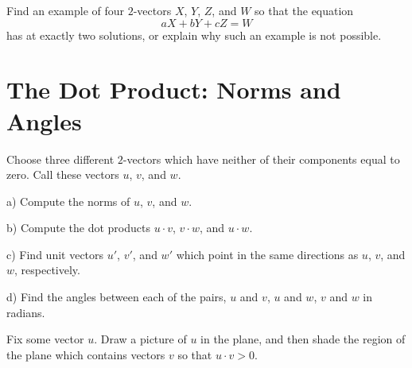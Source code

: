\documentclass[cahier-main.tex]{subfiles}
\begin{document}
\begin{challenge}
Find an example of four $2$-vectors $X$, $Y$, $Z$, and $W$ so that the equation
\[
aX+bY+cZ = W
\]
has at exactly two solutions, or explain why such an example is not possible.
\end{challenge}

\section*{The Dot Product: Norms and Angles}

\begin{task}
Choose three different $2$-vectors which have neither of their components equal to zero. Call these vectors $u$, $v$, and $w$.
\begin{compactitem}
\item[a)] Compute the norms of $u$, $v$, and $w$.
\item[b)] Compute the dot products $u\cdot v$, $v\cdot w$, and $u\cdot w$.
\item[c)] Find unit vectors $u'$, $v'$, and $w'$ which point in the same directions as $u$, $v$, and $w$, respectively.
\item[d)] Find the angles between each of the pairs, $u$ and $v$, $u$ and $w$, $v$ and $w$ in radians.
\end{compactitem}
\end{task}



\begin{task}
Fix some vector $u$. Draw a picture of $u$ in the plane, and then shade the region of the plane which contains vectors $v$ so that $u\cdot v> 0$.
\end{task}
\end{document}
